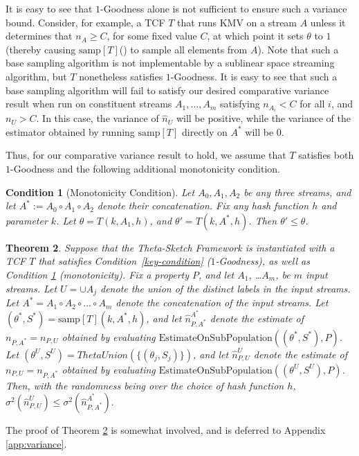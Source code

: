 \documentclass{article}
\newtheorem{theorem}{Theorem}[section]
\newtheorem{condition}[theorem]{Condition}
\newcommand{\romTS}{\hat{n}}
\newcommand{\estonsub}{\mathrm{EstimateOnSubPopulation}}
\newcommand{\samp}{\mathrm{samp}}
\begin{document}
It is easy to see that $1$-Goodness alone is not sufficient to ensure such a variance bound.
Consider, for example, a TCF $T$ that runs KMV 
on a stream $A$ unless it determines that $n_A \geq C$, for some fixed value $C$, at which point it sets $\theta$ to $1$ (thereby causing $\samp[T]$() to sample all elements from $A$). 
Note that such a base sampling algorithm is not implementable by a sublinear space streaming algorithm, but $T$ nonetheless satisfies $1$-Goodness.
It is easy to see that such a base sampling algorithm will fail to satisfy our desired comparative variance result when run on constituent streams $A_1, \dots, A_m$ satisfying $n_{A_i} < C$ for all $i$, and $n_U > C$. 
In this case, the variance of 
$\romTS_U$ will be positive, while the variance of the estimator obtained by running $\samp[T]$ directly on $A^*$ will be 0. 


Thus, for our comparative variance result to hold, we assume that $T$ satisfies both $1$-Goodness and the following additional monotonicity condition.


\begin{condition}[Monotonicity Condition] \label{mildcondition}
Let $A_0, A_1, A_2$ be any three streams, and let $A^* := A_0 \circ A_1 \circ A_2$ denote their concatenation. Fix any hash function $h$ and parameter $k$. Let $\theta=T(k, A_1, h)$, and $\theta'=T(k, A^*, h)$. Then $\theta' \leq \theta$. 
\end{condition}
\begin{theorem} \label{thm:variance}
Suppose that the Theta-Sketch Framework is instantiated with a TCF $T$ that satisfies Condition~\ref{key-condition} ($1$-Goodness), as well as Condition \ref{mildcondition} (monotonicity). Fix a property $P$, and
 let $A_1$,
\ldots $A_m$, be $m$ input streams.  Let $U = \cup A_j$ denote the union of the distinct labels in the input streams.
Let $A^* = A_1 \circ A_2 \circ \ldots \circ A_m$ denote the concatenation of the input streams.
Let $(\theta^*,S^*) = \samp[T](k,A^*,h)$, and let $\hat{n}^{A^*}_{P,A^*}$  denote the 
estimate of $n_{P,A^*}=n_{P, U}$ obtained by 
evaluating $\estonsub((\theta^*, S^*),P)$.
Let $(\theta^U,S^U) = ThetaUnion(\{(\theta_j,S_j)\})$, and 
let $\hat{n}^U_{P,U}$ 
denote the estimate of $n_{P,U} = n_{P,A^*}$ obtained by 
evaluating $\estonsub((\theta^U,S^U),P)$.
Then, with the randomness being over the choice of hash function $h$,
$\sigma^2(\hat{n}^U_{P,U}) \le \sigma^2(\hat{n}^{A^*}_{P,A^*}).$
\end{theorem}
The proof of Theorem \ref{thm:variance} is somewhat involved, and is deferred to Appendix \ref{app:variance}. 
\end{document}
